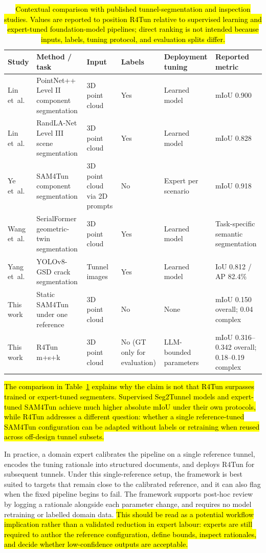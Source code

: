 \documentclass[a4paper,fleqn]{cas-dc}
\begin{document}
\begin{table}[t]
\caption{\hl{Contextual comparison with published tunnel-segmentation and inspection studies. Values are reported to position R4Tun relative to supervised learning and expert-tuned foundation-model pipelines; direct ranking is not intended because inputs, labels, tuning protocol, and evaluation splits differ.}}\label{tab:contextual-sota}
\begin{tabular*}{\textwidth}{@{\extracolsep{\fill}} l l l l l l @{}}
\toprule
Study & Method / task & Input & Labels & Deployment tuning & Reported metric \\
\midrule
Lin et~al.~\cite{lin2024seg2tunnel} & PointNet++ Level II component segmentation & 3D point cloud & Yes & Learned model & mIoU 0.900 \\
Lin et~al.~\cite{lin2024seg2tunnel} & RandLA-Net Level III scene segmentation & 3D point cloud & Yes & Learned model & mIoU 0.828 \\
Ye et~al.~\cite{ye2025sam4tun} & SAM4Tun component segmentation & 3D point cloud via 2D prompts & No & Expert per scenario & mIoU 0.918 \\
Wang et~al.~\cite{wang2026serialformer} & SerialFormer geometric-twin segmentation & 3D point cloud & Yes & Learned model & Task-specific semantic segmentation \\
Yang et~al.~\cite{yang2024yologsd} & YOLOv8-GSD crack segmentation & Tunnel images & Yes & Learned model & IoU 0.812 / AP 82.4\% \\
This work & Static SAM4Tun under one reference & 3D point cloud & No & None & mIoU 0.150 overall; 0.04 complex \\
This work & R4Tun m+s+k & 3D point cloud & No (GT only for evaluation) & LLM-bounded parameters & mIoU 0.316--0.342 overall; 0.18--0.19 complex \\
\bottomrule
\end{tabular*}
\end{table}

\hl{The comparison in Table~\ref{tab:contextual-sota} explains why the claim is not that R4Tun surpasses trained or expert-tuned segmenters. Supervised Seg2Tunnel models and expert-tuned SAM4Tun achieve much higher absolute mIoU under their own protocols, while R4Tun addresses a different question: whether a single reference-tuned SAM4Tun configuration can be adapted without labels or retraining when reused across off-design tunnel subsets.}


In practice, a domain expert calibrates the pipeline on a single reference tunnel, encodes the tuning rationale into structured documents, and deploys R4Tun for subsequent tunnels. Under this single-reference setup, the framework is best suited to targets that remain close to the calibrated reference, and it can also flag when the fixed pipeline begins to fail. The framework supports post-hoc review by logging a rationale alongside each parameter change, and requires no model retraining or labelled domain data. \hl{This should be read as a potential workflow implication rather than a validated reduction in expert labour: experts are still required to author the reference configuration, define bounds, inspect rationales, and decide whether low-confidence outputs are acceptable.}
\end{document}
